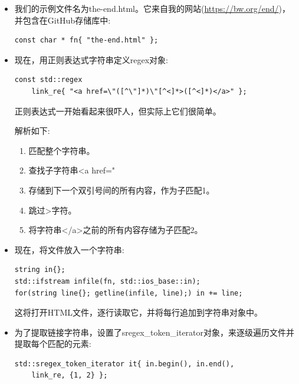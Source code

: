 \begin{itemize}
\item 
我们的示例文件名为the-end.html。它来自我的网站(\url{https://bw.org/end/})，并包含在GitHub存储库中:

\begin{lstlisting}[style=styleCXX]
const char * fn{ "the-end.html" };
\end{lstlisting}

\item 
现在，用正则表达式字符串定义regex对象:

\begin{lstlisting}[style=styleCXX]
const std::regex
	link_re{ "<a href=\"([^\"]*)\"[^<]*>([^<]*)</a>" };
\end{lstlisting}

正则表达式一开始看起来很吓人，但实际上它们很简单。

解析如下:

\begin{enumerate}[label=\Roman*.]
\item 
匹配整个字符串。

\item 
查找子字符串<a href="

\item 
存储到下一个双引号间的所有内容，作为子匹配1。

\item 
跳过>字符。

\item 
将字符串</a>之前的所有内容存储为子匹配2。
\end{enumerate}

\item 
现在，将文件放入一个字符串:

\begin{lstlisting}[style=styleCXX]
string in{};
std::ifstream infile(fn, std::ios_base::in);
for(string line{}; getline(infile, line);) in += line;
\end{lstlisting}

这将打开HTML文件，逐行读取它，并将每行追加到字符串对象中。

\item 
为了提取链接字符串，设置了sregex\_token\_iterator对象，来逐级遍历文件并提取每个匹配的元素:

\begin{lstlisting}[style=styleCXX]
std::sregex_token_iterator it{ in.begin(), in.end(),
	link_re, {1, 2} };
\end{lstlisting}


\end{itemize}

